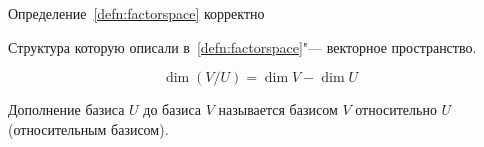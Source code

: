 \documentclass[12pt]{../../../notes}
\begin{document}
\begin{stat}\label{stat:corrfactspc}
  Определение~\ref{defn:factorspace} корректно
\end{stat}

\begin{stat}\label{stat:factspcISspace}
  Структура которую описали в~\ref{defn:factorspace}"--- векторное пространство.
\end{stat}

\begin{thrm}\label{thrm:dimfactspc}
  \[
    \dim (V/U) = \dim V - \dim U
  \]
\end{thrm}

\begin{defn}\label{defn:relbasis}
  Дополнение базиса $U$ до базиса $V$ называется базисом $V$ относительно $U$ (относительным
  базисом).
\end{defn}
\end{document}
